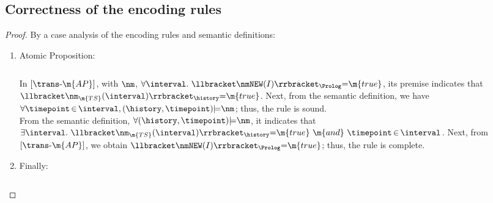
\subsection{Correctness of the encoding rules}
\label{app:correctness}

\ThemSoundAndComplete*
\begin{proof} By a case analysis of the encoding rules and semantic definitions: 

\begin{enumerate}[itemsep=1.5em,leftmargin=!]
\vspace{1em}
\item Atomic Proposition: 
{
\small 
\begin{align*}

\end{align*}
\vspace{-1mm}
\begin{align*}

\end{align*}
\vspace{-8mm}
}

In   
$[\trans\text{-}\m{AP}]$, with $\nm$, 
$\forall \interval.~\llbracket \nmNEW(I) \rrbracket_{\Prolog} {=} \m{true}$, 
its premise indicates that 
$\llbracket  \nm_{\m{TS}}(\interval)\rrbracket_{\history} {=} \m{true}$. 
Next, from the semantic definition, we have 
$\forall  \timepoint\,{\in}\,\interval, (\history, \timepoint) {\models} \nm$; thus, the rule is sound. 
\\
From the semantic definition, $\forall   (\history, \timepoint) {\models} \nm$, it indicates that $\exists\interval.~\llbracket  \nm_{\m{TS}}(\interval)\rrbracket_{\history} {=} \m{true} ~\m{and}~
\timepoint\,{\in}\,\interval$.  
Next, from $[\trans\text{-}\m{AP}]$, we obtain 
$\llbracket \nmNEW(I) \rrbracket_{\Prolog} {=} \m{true}$; thus, the rule is complete. 



\item  Finally:
{
\small 
\begin{align*}

\end{align*}
\vspace{-1mm}
\begin{align*}

\end{align*}
\vspace{-8mm}
}




\end{enumerate}
\end{proof}
